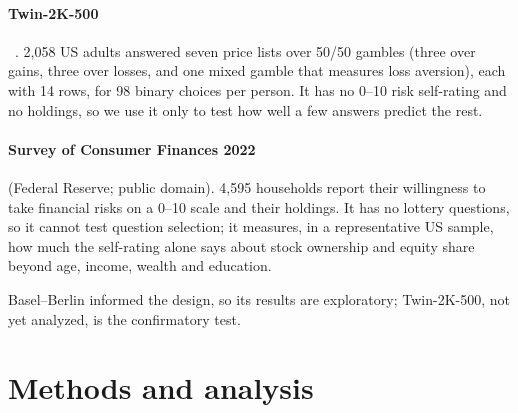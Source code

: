 \documentclass{article}
\begin{document}
\paragraph{Twin-2K-500}~\citep[CC BY 4.0]{toubia2025}.
2,058 US adults answered seven price lists over 50/50 gambles (three over gains, three over losses, and one mixed gamble that measures loss aversion), each with 14 rows, for 98 binary choices per person. It has no 0--10 risk self-rating and no holdings, so we use it only to test how well a few answers predict the rest.

\paragraph{Survey of Consumer Finances 2022} (Federal Reserve; public domain).
4,595 households report their willingness to take financial risks on a 0--10 scale and their holdings. It has no lottery questions, so it cannot test question selection; it measures, in a representative US sample, how much the self-rating alone says about stock ownership and equity share beyond age, income, wealth and education.

Basel--Berlin informed the design, so its results are exploratory; Twin-2K-500, not yet analyzed, is the confirmatory test.

\section{Methods and analysis}
\end{document}
